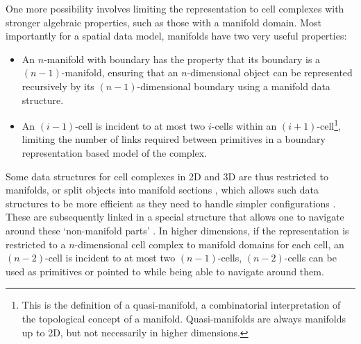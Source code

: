 One more possibility involves limiting the representation to cell complexes with stronger algebraic properties, such as those with a manifold domain.
Most importantly for a spatial data model, manifolds have two very useful properties:
\begin{itemize}
\item
An $n$-manifold with boundary has the property that its boundary is a $(n-1)$-manifold, ensuring that an $n$-dimensional object can be represented recursively by its $(n-1)$-dimensional boundary using a manifold data structure.
\item
An $(i-1)$-cell is incident to at most two $i$-cells within an $(i+1)$-cell\footnote{This is the definition of a quasi-manifold, a combinatorial interpretation of the topological concept of a manifold. Quasi-manifolds are always manifolds up to 2D, but not necessarily in higher dimensions.}, limiting the number of links required between primitives in a boundary representation based model of the complex.
\end{itemize}

Some data structures for cell complexes in 2D and 3D are thus restricted to manifolds, or split objects into manifold sections \citep{Pesco04,Lopes97}, which allows such data structures to be more efficient as they need to handle simpler configurations \citep{Aguila03}.
These are subsequently linked in a special structure that allows one to navigate around these `non-manifold parts' \citep{Weiler88,Gursoz90,Lee01}.
In higher dimensions, if the representation is restricted to a $n$-dimensional cell complex to manifold domains for each cell, an $(n-2)$-cell is incident to at most two $(n-1)$-cells, $(n-2)$-cells can be used as primitives or pointed to while being able to navigate around them.

